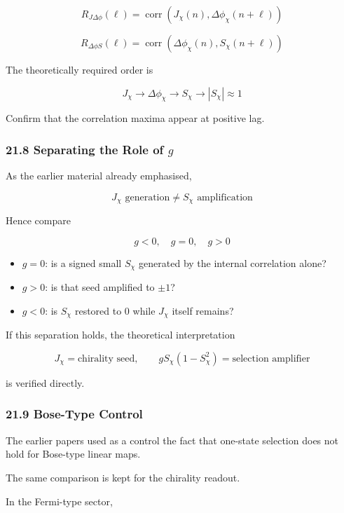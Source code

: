 \documentclass[
  a4paper,
]{article}
\providecommand{\tightlist}{%
  \setlength{\itemsep}{0pt}\setlength{\parskip}{0pt}}
\begin{document}
\[
R_{J\Delta\phi}(\ell)
=
\operatorname{corr}
\left(
J_\chi(n),
\Delta\phi_\chi(n+\ell)
\right)
\]

\[
R_{\Delta\phi S}(\ell)
=
\operatorname{corr}
\left(
\Delta\phi_\chi(n),
S_\chi(n+\ell)
\right)
\]

The theoretically required order is

\[
\boxed{
J_\chi
\to
\Delta\phi_\chi
\to
S_\chi
\to
|S_\chi|\approx1
}
\tag{188}
\]

Confirm that the correlation maxima appear at positive lag.

\subsubsection{\texorpdfstring{21.8 Separating the Role of
\(g\)}{21.8 Separating the Role of g}}\label{separating-the-role-of-g}

As the earlier material already emphasised,

\[
\boxed{
J_\chi\text{ generation}
\neq
S_\chi\text{ amplification}
}
\tag{189}
\]

Hence compare

\[
g<0,\quad g=0,\quad g>0
\]

\begin{itemize}
\tightlist
\item
  \(g=0\): is a signed small \(S_\chi\) generated by the internal
  correlation alone?
\item
  \(g>0\): is that seed amplified to \(\pm1\)?
\item
  \(g<0\): is \(S_\chi\) restored to 0 while \(J_\chi\) itself remains?
\end{itemize}

If this separation holds, the theoretical interpretation

\[
\boxed{
J_\chi
=
\text{chirality seed},
\qquad
gS_\chi(1-S_\chi^2)
=
\text{selection amplifier}
}
\tag{190}
\]

is verified directly.

\subsubsection{21.9 Bose-Type Control}\label{bose-type-control}

The earlier papers used as a control the fact that one-state selection
does not hold for Bose-type linear maps.

The same comparison is kept for the chirality readout.

In the Fermi-type sector,
\end{document}
